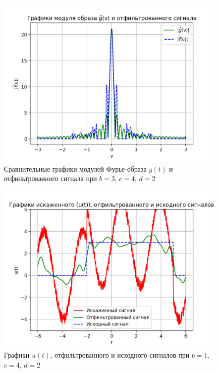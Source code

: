 \begin{figure}[ht!]
    \centering
    \includegraphics[scale=0.55]{media/1 task/specific_freq/Fourier_Image_Comparison_3_4_2_-0,6_-0,22_-2,99_-1,6.png}
    \caption{Сравнительные графики модулей Фурье-образа $g(t)$ и отфильтрованного сигнала при  $b=3$,  $c=4$,  $d=2$}
    \label{fig:fourc_3_4_2}
\end{figure}

\clearpage

\begin{figure}[ht!]
    \centering
    \includegraphics[scale=0.85]{media/1 task/specific_freq/Cleaned_1_4_2_-0,6_-0,22_-2,99_-1,6.png}
    \caption{Графики  $u(t)$, отфильтрованного и исходного сигналов при $b=1$,  $c=4$,  $d=2$}
    \label{fig:cleaned_1_4_2}
\end{figure}

